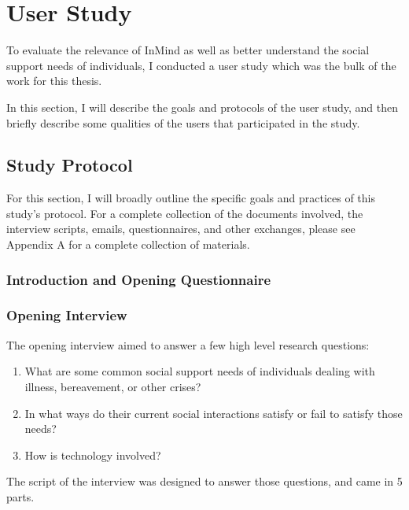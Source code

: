 \chapter{User Study}
To evaluate the relevance of InMind as well as better understand
the social support needs of individuals,
I conducted a user study which was the bulk of the work for this thesis.

In this section, I will describe the goals and protocols of the user study,
and then briefly describe some qualities of the users that participated
in the study.

\section{Study Protocol}
  For this section, I will broadly outline the specific goals
  and practices of this study's protocol.
  For a complete collection of the documents involved,
  the interview scripts, emails, questionnaires, and other exchanges,
  please see Appendix A for a complete collection of materials.

  \subsection{Introduction and Opening Questionnaire}
  
  \subsection{Opening Interview}
  The opening interview aimed to answer a few high level research questions:
  \begin{enumerate}
  \item What are some common social support needs of individuals
  dealing with illness, bereavement, or other crises?
  \item In what ways do their current social interactions satisfy
  or fail to satisfy those needs?
  \item How is technology involved?
  \end{enumerate}

  The script of the interview was designed to answer those questions,
  and came in 5 parts.

